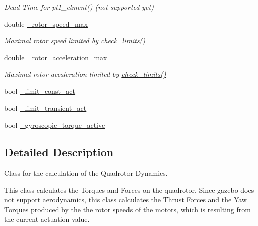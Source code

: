 \begin{DoxyCompactItemize}
\begin{DoxyCompactList}\small\item\em \-Dead \-Time for pt1\-\_\-elment() (not supported yet) \end{DoxyCompactList}\item 
\hypertarget{classQuadRotorDynamics_acae91d3031650906ca6a995ae0443813}{double \hyperlink{classQuadRotorDynamics_acae91d3031650906ca6a995ae0443813}{\-\_\-rotor\-\_\-speed\-\_\-max}}\label{classQuadRotorDynamics_acae91d3031650906ca6a995ae0443813}

\begin{DoxyCompactList}\small\item\em \-Maximal rotor speed limited by \hyperlink{classQuadRotorDynamics_a8c92658749a4850ff5926d580e418e7c}{check\-\_\-limits()} \end{DoxyCompactList}\item 
\hypertarget{classQuadRotorDynamics_acd0beff4d2419aa7aa37d87c3c5690bf}{double \hyperlink{classQuadRotorDynamics_acd0beff4d2419aa7aa37d87c3c5690bf}{\-\_\-rotor\-\_\-acceleration\-\_\-max}}\label{classQuadRotorDynamics_acd0beff4d2419aa7aa37d87c3c5690bf}

\begin{DoxyCompactList}\small\item\em \-Maximal rotor accaleration limited by \hyperlink{classQuadRotorDynamics_a8c92658749a4850ff5926d580e418e7c}{check\-\_\-limits()} \end{DoxyCompactList}\item 
bool \hyperlink{classQuadRotorDynamics_a52129351aee2aa2ca2218c888f83fa8f}{\-\_\-limit\-\_\-const\-\_\-act}
\item 
bool \hyperlink{classQuadRotorDynamics_a68be41ce31d096a587aabdc2c6f0bcfb}{\-\_\-limit\-\_\-transient\-\_\-act}
\item 
bool \hyperlink{classQuadRotorDynamics_a2f2eb8e9690abdc5679f0172e71b56fe}{\-\_\-gyroscopic\-\_\-torque\-\_\-active}
\end{DoxyCompactItemize}


\subsection{\-Detailed \-Description}
\-Class for the calculation of the \-Quadrotor \-Dynamics. 

\-This class calculates the \-Torques and \-Forces on the quadrotor. \-Since gazebo does not support aerodynamics, this class calculates the \hyperlink{classThrust}{\-Thrust} \-Forces and the \-Yaw \-Torques produced by the the rotor speeds of the motors, which is resulting from the current actuation value. 


